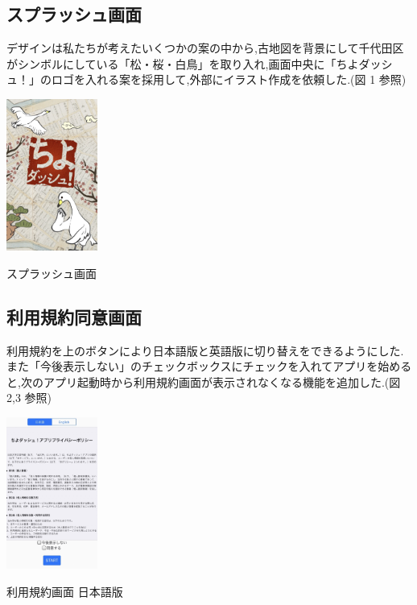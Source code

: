 \documentclass[a4paper, twoside]{jarticle}
\makeatletter
\newenvironment{figurehere}
  {\def\@captype{figure}}
  {}
\makeatother
\begin{document}
\begin{multicols}{2}
\subsection{スプラッシュ画面}
デザインは私たちが考えたいくつかの案の中から,古地図を背景にして千代田区がシンボルにしている「松・桜・白鳥」を取り入れ,画面中央に「ちよダッシュ！」のロゴを入れる案を採用して,外部にイラスト作成を依頼した.(図 1 参照)

\begin{figurehere}
\begin{center}
\includegraphics[bb=30 50 550 1300,width=3cm]{./image01.jpg}%
\end{center}
\caption{スプラッシュ画面}\label{fig:1}
\end{figurehere}

\subsection{利用規約同意画面}
利用規約を上のボタンにより日本語版と英語版に切り替えをできるようにした.
また「今後表示しない」のチェックボックスにチェックを入れてアプリを始めると,次のアプリ起動時から利用規約画面が表示されなくなる機能を追加した.(図 2,3 参照)
\begin{figurehere}
\begin{center}
\includegraphics[bb=30 50 550 1300,width=3cm]{./image02.jpg}%
\end{center}
\caption{利用規約画面 日本語版}\label{fig:2}


\end{figurehere}
\end{multicols}
\end{document}
